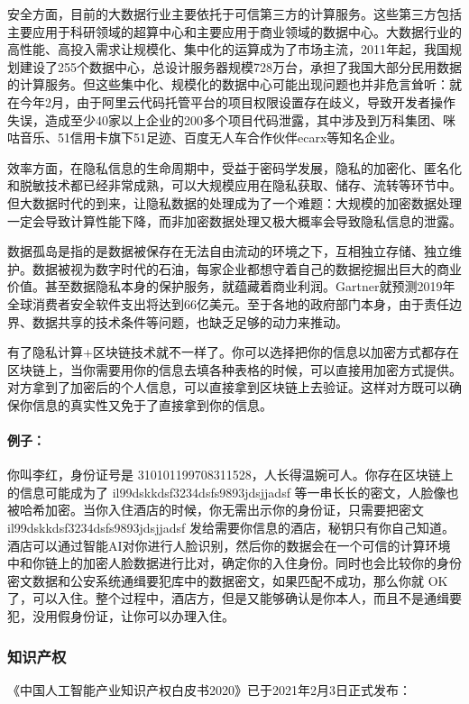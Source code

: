 \documentclass[letterpaper,10pt,english]{sphinxmanual}
\begin{document}
安全方面，目前的大数据行业主要依托于可信第三方的计算服务。这些第三方包括主要应用于科研领域的超算中心和主要应用于商业领域的数据中心。大数据行业的高性能、高投入需求让规模化、集中化的运算成为了市场主流，2011年起，我国规划建设了255个数据中心，总设计服务器规模728万台，承担了我国大部分民用数据的计算服务。但这些集中化、规模化的数据中心可能出现问题也并非危言耸听：就在今年2月，由于阿里云代码托管平台的项目权限设置存在歧义，导致开发者操作失误，造成至少40家以上企业的200多个项目代码泄露，其中涉及到万科集团、咪咕音乐、51信用卡旗下51足迹、百度无人车合作伙伴ecarx等知名企业。

效率方面，在隐私信息的生命周期中，受益于密码学发展，隐私的加密化、匿名化和脱敏技术都已经非常成熟，可以大规模应用在隐私获取、储存、流转等环节中。但大数据时代的到来，让隐私数据的处理成为了一个难题：大规模的加密数据处理一定会导致计算性能下降，而非加密数据处理又极大概率会导致隐私信息的泄露。

数据孤岛是指的是数据被保存在无法自由流动的环境之下，互相独立存储、独立维护。数据被视为数字时代的石油，每家企业都想守着自己的数据挖掘出巨大的商业价值。甚至数据隐私本身的保护服务，就蕴藏着商业利润。Gartner就预测2019年全球消费者安全软件支出将达到66亿美元。至于各地的政府部门本身，由于责任边界、数据共享的技术条件等问题，也缺乏足够的动力来推动。

有了隐私计算+区块链技术就不一样了。你可以选择把你的信息以加密方式都存在区块链上，当你需要用你的信息去填各种表格的时候，可以直接用加密方式提供。对方拿到了加密后的个人信息，可以直接拿到区块链上去验证。这样对方既可以确保你信息的真实性又免于了直接拿到你的信息。


\paragraph{例子：}
\label{\detokenize{chapter_data_dive/privacy_computing:id3}}
你叫李红，身份证号是
310101199708311528，人长得温婉可人。你存在区块链上的信息可能成为了
il99dskkdsf3234dsfs9893jdsjjadsf
等一串长长的密文，人脸像也被哈希加密。当你入住酒店的时候，你无需出示你的身份证，只需要把密文
il99dskkdsf3234dsfs9893jdsjjadsf
发给需要你信息的酒店，秘钥只有你自己知道。酒店可以通过智能AI对你进行人脸识别，然后你的数据会在一个可信的计算环境中和你链上的加密人脸数据进行比对，确定你的入住身份。同时也会比较你的身份密文数据和公安系统通缉要犯库中的数据密文，如果匹配不成功，那么你就
OK
了，可以入住。整个过程中，酒店方，但是又能够确认是你本人，而且不是通缉要犯，没用假身份证，让你可以办理入住。


\subsubsection{知识产权}
\label{\detokenize{chapter_data_dive/intellectual property:id1}}\label{\detokenize{chapter_data_dive/intellectual property::doc}}
《中国人工智能产业知识产权白皮书2020》已于2021年2月3日正式发布：
\end{document}
